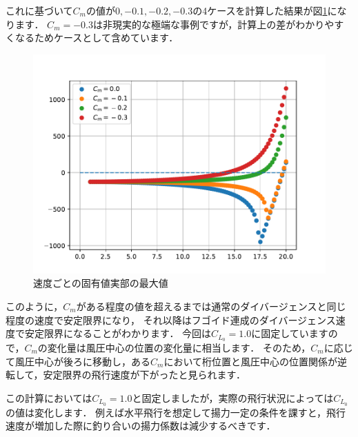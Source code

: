 \documentclass{jarticle}
\begin{document}
これに基づいて$C_m$の値が$0,-0.1,-0.2,-0.3$の4ケースを計算した結果が図\ref{eigen2}になります．
$C_m=-0.3$は非現実的な極端な事例ですが，計算上の差がわかりやすくなるためケースとして含めています．
\begin{figure}[H]
    \centering
    \includegraphics[width=0.7\linewidth]{image/eigenplot.pdf}
    \caption{速度ごとの固有値実部の最大値}
    \label{eigen2}
\end{figure}
このように，$C_m$がある程度の値を超えるまでは通常のダイバージェンスと同じ程度の速度で安定限界になり，
それ以降はフゴイド連成のダイバージェンス速度で安定限界になることがわかります．
今回は$C_{L_0}=1.0$に固定していますので，$C_m$の変化量は風圧中心の位置の変化量に相当します．
そのため，$C_m$に応じて風圧中心が後ろに移動し，ある$C_m$において桁位置と風圧中心の位置関係が逆転して，安定限界の飛行速度が下がったと見られます．

この計算においては$C_{L_0}=1.0$と固定しましたが，実際の飛行状況によっては$C_{L_0}$の値は変化します．
例えば水平飛行を想定して揚力一定の条件を課すと，飛行速度が増加した際に釣り合いの揚力係数は減少するべきです．
\end{document}
